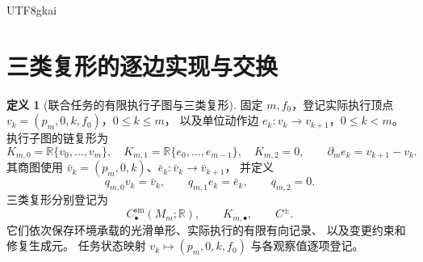\documentclass[12pt,a4paper,openany,notitlepage]{report}
\theoremstyle{plain}
\theoremstyle{definition}
\newtheorem{definition}[theorem]{定义}
\theoremstyle{remark}
\begin{document}
\begin{CJK*}{UTF8}{gkai}
\section{三类复形的逐边实现与交换}

\begin{definition}[联合任务的有限执行子图与三类复形]
\label{hgov:def:jointgraph}
固定 $m,f_0$，登记实际执行顶点
$v_k=(p_m,0,k,f_0)$，$0\le k\le m$，
以及单位动作边 $e_k:v_k\to v_{k+1}$，$0\le k<m$。
执行子图的链复形为
\[
 K_{m,0}=\mathbb R\{v_0,\ldots,v_m\},\quad
 K_{m,1}=\mathbb R\{e_0,\ldots,e_{m-1}\},\quad
 K_{m,2}=0,\qquad
 \partial_me_k=v_{k+1}-v_k.
\]
其商图使用 $\bar v_k=(p_m,0,k)$、$\bar e_k:\bar v_k\to\bar v_{k+1}$，
并定义
\[
 q_{m,0}v_k=\bar v_k,\qquad
 q_{m,1}e_k=\bar e_k,\qquad q_{m,2}=0.
\]
三类复形分别登记为
\[
 C_\bullet^{\mathrm{sm}}(M_m;\mathbb R),\qquad
 K_{m,\bullet},\qquad C^\pm.
\]
它们依次保存环境承载的光滑单形、实际执行的有限有向记录、
以及变更约束和修复生成元。
任务状态映射 $v_k\mapsto(p_m,0,k,f_0)$ 与各观察值逐项登记。
\end{definition}


\end{CJK*}
\end{document}
